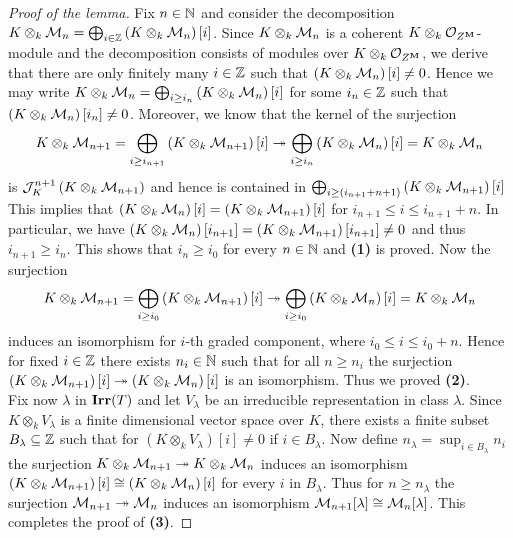 \begin{proof}[Proof of the lemma]
Fix $n\in {\mathbb N}$ and consider the decomposition $K\otimes_k{\mathcal M}_n = \bigoplus_{i\in {\mathbb Z}}\left(K\otimes_k{\mathcal M}_n\right)[i]$. Since $K\otimes_k{\mathcal M}_n$ is a coherent $K\otimes_k {\mathcal O}_{Z^{\mathbf{M}}}$-module and the decomposition consists of modules over $K\otimes_k{\mathcal O}_{Z^{\mathbf{M}}}$, we derive that there are only finitely many $i\in {\mathbb Z}$ such that $\left(K\otimes_k{\mathcal M}_n\right)[i]\neq 0$. Hence we may write $K\otimes_k{\mathcal M}_n = \bigoplus_{i\geq i_n}\left(K\otimes_k{\mathcal M}_n\right)[i]$ for some $i_n\in {\mathbb Z}$ such that $\left(K\otimes_k{\mathcal M}_n\right)[i_n] \neq 0$. Moreover, we know that the kernel of the surjection
$$K\otimes_k{\mathcal M}_{n+1} = \bigoplus_{i\geq i_{n+1}}\left(K\otimes_k{\mathcal M}_{n+1}\right)[i] \twoheadrightarrow \bigoplus_{i\geq i_n}\left(K\otimes_k{\mathcal M}_n\right)[i] = K\otimes_k{\mathcal M}_n$$
is ${\mathcal J}_K^{n+1}\left(K\otimes_k{\mathcal M}_{n+1}\right)$ and hence is contained in $\bigoplus_{i\geq (i_{n+1}+n+1)}\left(K\otimes_k{\mathcal M}_{n+1}\right)[i]$
This implies that $\left(K\otimes_k{\mathcal M}_{n}\right)[i]  = \left(K\otimes_k{\mathcal M}_{n+1}\right)[i]$ for $i_{n+1}\leq i \leq i_{n+1}+n$. In particular, we have $\left(K\otimes_k{\mathcal M}_{n}\right)[i_{n+1}]  = \left(K\otimes_k{\mathcal M}_{n+1}\right)[i_{n+1}] \neq 0$ and thus $i_{n+1} \geq i_n$. This shows that $i_n\geq i_0$ for every $n\in {\mathbb N}$ and \textbf{(1)} is proved. Now the surjection
$$K\otimes_k{\mathcal M}_{n+1} = \bigoplus_{i\geq i_{0}}\left(K\otimes_k{\mathcal M}_{n+1}\right)[i] \twoheadrightarrow \bigoplus_{i\geq i_0}\left(K\otimes_k{\mathcal M}_n\right)[i] = K\otimes_k{\mathcal M}_n$$
induces an isomorphism for $i$-th graded component, where $i_0 \leq i\leq i_0+n$. Hence for fixed $i\in {\mathbb Z}$ there exists $n_i\in {\mathbb N}$ such that for all $n\geq n_i$ the surjection $\left(K\otimes_k{\mathcal M}_{n+1}\right)[i] \twoheadrightarrow \left(K\otimes_k{\mathcal M}_n\right)[i]$ is an isomorphism. Thus we proved \textbf{(2)}.\\
Fix now $\lambda$ in $\mathbf{Irr}(T)$ and let $V_{\lambda}$ be an irreducible representation in class $\lambda$. Since $K\otimes_kV_{\lambda}$ is a finite dimensional vector space over $K$, there exists a finite subset $B_{\lambda}\subseteq {\mathbb Z}$ such that for $\left(K\otimes_kV_{\lambda}\right)[i] \neq 0$ if $i\in B_{\lambda}$. Now define $n_{\lambda} = \sup_{i\in B_{\lambda}}n_i$ the surjection $K\otimes_k{\mathcal M}_{n+1}\twoheadrightarrow K\otimes_k{\mathcal M}_n$ induces an isomorphism $\left(K\otimes_k{\mathcal M}_{n+1}\right)[i] \cong \left(K\otimes_k{\mathcal M}_n\right)[i]$ for every $i$ in $B_{\lambda}$. Thus for $n\geq n_{\lambda}$ the surjection ${\mathcal M}_{n+1}\twoheadrightarrow {\mathcal M}_n$ induces an isomorphism ${\mathcal M}_{n+1}[\lambda]\cong {\mathcal M}_n[\lambda]$. This completes the proof of \textbf{(3)}.
\end{proof}

